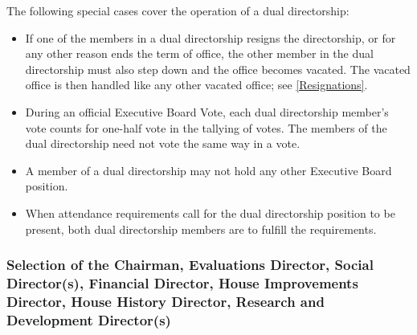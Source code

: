 \documentclass{article}
\newcommand{\asubsection}[1]{\subsubsection{#1} \label{#1}}
\begin{document}
The following special cases cover the operation of a dual directorship:
\begin{itemize}
	\item If one of the members in a dual directorship resigns the directorship, or for any other reason ends the term of office, the other member in the dual directorship must also step down and the office becomes vacated. The vacated office is then handled like any other vacated office; see \ref{Resignations}.
	\item During an official Executive Board Vote, each dual directorship member's vote counts for one-half vote in the tallying of votes. The members of the dual directorship need not vote the same way in a vote.
	\item A member of a dual directorship may not hold any other Executive Board position.
	\item When attendance requirements call for the dual directorship position to be present, both dual directorship members are to fulfill the requirements.
\end{itemize}
\asubsection{Selection of the Chairman, Evaluations Director, Social Director(s), Financial Director, House Improvements Director, House History Director, Research and Development Director(s)}
\end{document}
